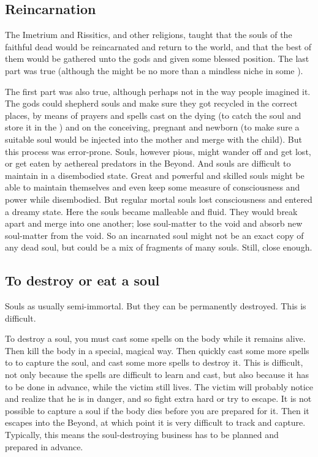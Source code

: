 \subsection{Reincarnation}
The Imetrium and Rissitics, and other religions, taught that the souls of the faithful dead would be reincarnated and return to the world, and that the best of them would be gathered unto the gods and given some blessed position.
The last part was true (although the  might be no more than a mindless niche in some \matrix).

The first part was also true, although perhaps not in the way people imagined it. 
The gods could shepherd souls and make sure they got recycled in the correct places, by means of prayers and spells cast on the dying (to catch the soul and store it in the \matrix) and on the conceiving, pregnant and newborn (to make sure a suitable soul would be injected into the mother and merge with the child). 
But this process was error-prone. 
Souls, however pious, might wander off and get lost, or get eaten by aethereal predators in the Beyond.
And souls are difficult to maintain in a disembodied state.
Great and powerful and skilled souls might be able to maintain themselves and even keep some measure of consciousness and power while disembodied.
But regular mortal souls lost consciousness and entered a dreamy state.
Here the souls became malleable and fluid.
They would break apart and merge into one another; lose soul-matter to the void and absorb new soul-matter from the void.
So an incarnated soul might not be an exact copy of any dead soul, but could be a mix of fragments of many souls.
Still, close enough.










\subsection{To destroy or eat a soul}
Souls as usually semi-immortal. 
But they can be permanently destroyed. 
This is difficult. 

To destroy a soul, you must cast some spells on the body while it remains alive.
Then kill the body in a special, magical way. 
Then quickly cast some more spells to to capture the soul, and cast some more spells to destroy it. 
This is difficult, not only because the spells are difficult to learn and cast, but also because it has to be done in advance, while the victim still lives. 
The victim will probably notice and realize that he is in danger, and so fight extra hard or try to escape. 
It is not possible to capture a soul if the body dies before you are prepared for it. 
Then it escapes into the Beyond, at which point it is very difficult to track and capture. 
Typically, this means the soul-destroying business has to be planned and prepared in advance. 

